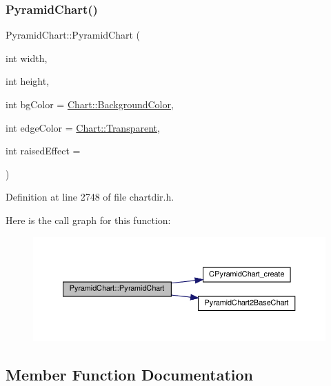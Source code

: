 \subsubsection{\texorpdfstring{Pyramid\+Chart()}{PyramidChart()}}
{\footnotesize\ttfamily Pyramid\+Chart\+::\+Pyramid\+Chart (\begin{DoxyParamCaption}\item[{int}]{width,  }\item[{int}]{height,  }\item[{int}]{bg\+Color = {\ttfamily \hyperlink{namespace_chart_abee0d882fdc9ad0b001245ad9fc64011a134193bde693b9d152d0c6dc59fa7d7f}{Chart\+::\+Background\+Color}},  }\item[{int}]{edge\+Color = {\ttfamily \hyperlink{namespace_chart_abee0d882fdc9ad0b001245ad9fc64011afc6811800a9e2582dac0157b6279f836}{Chart\+::\+Transparent}},  }\item[{int}]{raised\+Effect = {} }\end{DoxyParamCaption})\hspace{0.3cm}{\ttfamily [inline]}}



Definition at line 2748 of file chartdir.\+h.

Here is the call graph for this function\+:
\nopagebreak
\begin{figure}[H]
\begin{center}
\leavevmode
\includegraphics[width=350pt]{class_pyramid_chart_a67f11678a7a45f0293f06afd0bdacda5_cgraph}
\end{center}
\end{figure}


\subsection{Member Function Documentation}
\mbox{\label{class_pyramid_chart_abfcc75e4f7e3f2403701d1c824d85ffe}} 
